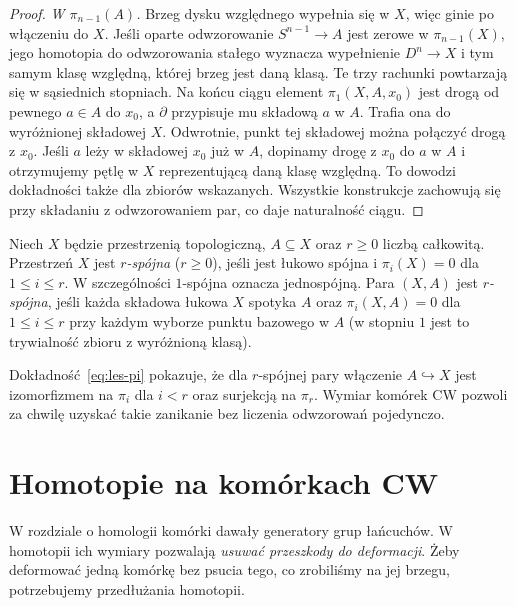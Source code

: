 \begin{proof}
\emph{W $\pi_{n-1}(A)$.} Brzeg
dysku względnego wypełnia
się w $X$, więc ginie
po włączeniu do $X$.
Jeśli oparte odwzorowanie
$S^{n-1}\to A$ jest
zerowe w $\pi_{n-1}(X)$,
jego homotopia do odwzorowania
stałego wyznacza wypełnienie
$D^n\to X$ i tym samym
klasę względną, której
brzeg jest daną klasą.
Te trzy rachunki powtarzają się w sąsiednich stopniach.
Na końcu ciągu element $\pi_1(X,A,x_0)$ jest drogą
od pewnego $a\in A$ do $x_0$, a $\partial$ przypisuje mu
składową $a$ w $A$. Trafia ona do wyróżnionej składowej $X$.
Odwrotnie, punkt tej składowej można połączyć drogą z $x_0$.
Jeśli $a$ leży w składowej $x_0$ już w $A$, dopinamy drogę
z $x_0$ do $a$ w $A$ i otrzymujemy pętlę w $X$ reprezentującą
daną klasę względną. To dowodzi dokładności także dla zbiorów wskazanych.
Wszystkie konstrukcje zachowują się przy składaniu z odwzorowaniem par,
co daje naturalność ciągu.
\end{proof}

\begin{definicja}
\label{def:spojnosc-homotopijna}
Niech $X$ będzie przestrzenią topologiczną,
$A\subseteq X$ oraz $r\geq0$ liczbą całkowitą.
Przestrzeń $X$ jest
\emph{$r$-spójna} ($r\geq0$),
jeśli jest łukowo spójna
i $\pi_i(X)=0$ dla $1\leq i\leq r$.
W szczególności $1$-spójna
oznacza jednospójną.
Para $(X,A)$ jest
\emph{$r$-spójna}, jeśli
każda składowa łukowa $X$
spotyka $A$ oraz
$\pi_i(X,A)=0$ dla
$1\leq i\leq r$ przy każdym wyborze punktu bazowego w $A$
(w stopniu $1$ jest to
trywialność zbioru
z wyróżnioną klasą).
\end{definicja}

Dokładność~\eqref{eq:les-pi}
pokazuje, że dla $r$-spójnej
pary włączenie $A\hookrightarrow X$
jest izomorfizmem na
$\pi_i$ dla $i<r$ oraz
surjekcją na $\pi_r$.
Wymiar komórek CW pozwoli
za chwilę uzyskać takie
zanikanie bez liczenia odwzorowań
pojedynczo.

\section{Homotopie na komórkach CW}
\label{sec:pi-n-cw}

W rozdziale o homologii komórki dawały
generatory grup łańcuchów. W homotopii
ich wymiary pozwalają \emph{usuwać
przeszkody do deformacji}. Żeby
deformować jedną komórkę bez psucia
tego, co zrobiliśmy na jej brzegu,
potrzebujemy przedłużania homotopii.

